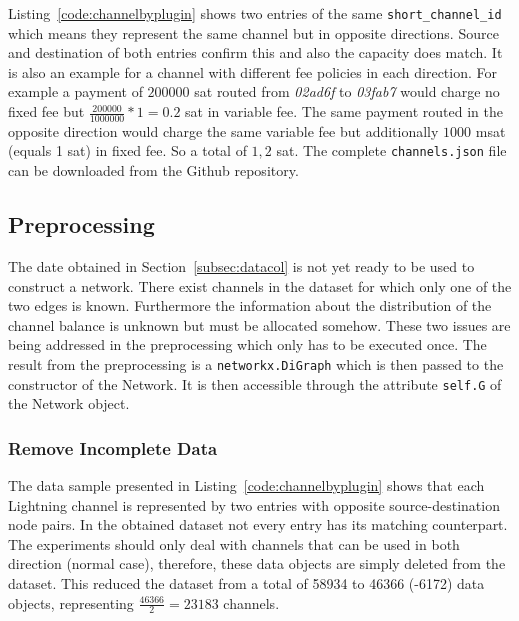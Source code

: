\documentclass[final]{fhnwreport}       %
\begin{document}
Listing~\ref{code:channelbyplugin} shows two entries of the same \texttt{short\_channel\_id} which means they represent the same channel but in opposite directions. Source and destination of both entries confirm this and also the capacity does match. It is also an example for a channel with different fee policies in each direction. For example a payment of $200000$ sat routed from \emph{02ad6f} to \emph{03fab7} would charge no fixed fee but $\frac{200000}{1000000}*1 = 0.2$ sat in variable fee. The same payment routed in the opposite direction would charge the same variable fee but additionally $1000$ msat (equals 1 sat) in fixed fee. So a total of $1,2$ sat. The complete \texttt{channels.json} file can be downloaded from the Github repository. 

\subsection{Preprocessing}\label{subsec:preproc}
The date obtained in Section~\ref{subsec:datacol} is not yet ready to be used to construct a network. There exist channels in the dataset for which only one of the two edges is known. Furthermore the information about the distribution of the channel balance is unknown but must be allocated somehow. These two issues are being addressed in the preprocessing which only has to be executed once. The result from the preprocessing is a \texttt{networkx.DiGraph} which is then passed to the constructor of the Network. It is then accessible through the attribute \texttt{self.G} of the Network object.

\subsubsection{Remove Incomplete Data}
The data sample presented in Listing~\ref{code:channelbyplugin} shows that each Lightning channel is represented by two entries with opposite source-destination node pairs. In the obtained dataset not every entry has its matching counterpart. The experiments should only deal with channels that can be used in both direction (normal case), therefore, these data objects are simply deleted from the dataset. This reduced the dataset from a total of 58934 to 46366 (-6172) data objects, representing $\frac{46366}{2}=23183$ channels.  
\end{document}
